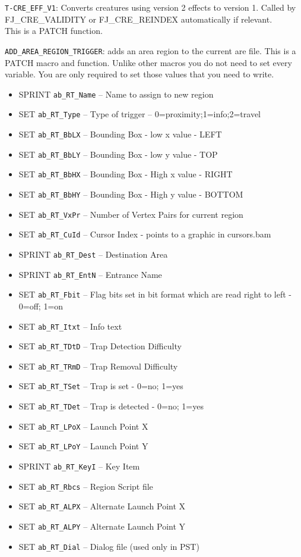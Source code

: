\documentclass{article}
\begin{document}
\verb+T-CRE_EFF_V1+: Converts creatures using version 2 effects to version 1. Called by FJ_CRE_VALIDITY or FJ_CRE_REINDEX automatically if relevant.\\
This is a PATCH function.

\verb+ADD_AREA_REGION_TRIGGER+: adds an area region to the current are file.
This is a PATCH macro and function. Unlike other macros you do not need to set every variable. You are only required to set those values that you need to write.
\begin{itemize}
\item SPRINT \verb+ab_RT_Name+ -- Name to assign to new region
\item SET \verb+ab_RT_Type+ -- Type of trigger -- 0=proximity;1=info;2=travel
\item SET \verb+ab_RT_BbLX+ -- Bounding Box - low x value  - LEFT
\item SET \verb+ab_RT_BbLY+ -- Bounding Box - low y value  - TOP
\item SET \verb+ab_RT_BbHX+ -- Bounding Box - High x value - RIGHT
\item SET \verb+ab_RT_BbHY+ -- Bounding Box - High y value - BOTTOM
\item SET \verb+ab_RT_VxPr+ -- Number of Vertex Pairs for current region
\item SET \verb+ab_RT_CuId+ -- Cursor Index - points to a graphic in cursors.bam
\item SPRINT \verb+ab_RT_Dest+ -- Destination Area
\item SPRINT \verb+ab_RT_EntN+ -- Entrance Name
\item SET \verb+ab_RT_Fbit+ -- Flag bits set in bit format which are read right to left - 0=off; 1=on
\item SET \verb+ab_RT_Itxt+ -- Info text
\item SET \verb+ab_RT_TDtD+ -- Trap Detection Difficulty
\item SET \verb+ab_RT_TRmD+ -- Trap Removal Difficulty
\item SET \verb+ab_RT_TSet+ -- Trap is set - 0=no; 1=yes
\item SET \verb+ab_RT_TDet+ -- Trap is detected - 0=no; 1=yes
\item SET \verb+ab_RT_LPoX+ -- Launch Point X
\item SET \verb+ab_RT_LPoY+ -- Launch Point Y
\item SPRINT \verb+ab_RT_KeyI+ -- Key Item
\item SET \verb+ab_RT_Rbcs+ -- Region Script file
\item SET \verb+ab_RT_ALPX+ -- Alternate Launch Point X
\item SET \verb+ab_RT_ALPY+ -- Alternate Launch Point Y
\item SET \verb+ab_RT_Dial+ -- Dialog file (used only in PST)
\end{itemize}
\end{document}
